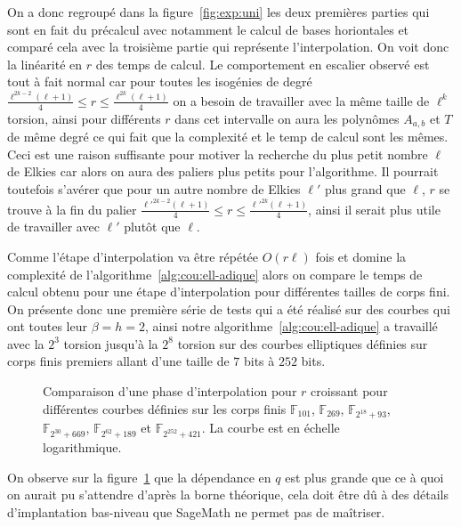 \documentclass[10pt,a4paper]{book}
\theoremstyle{plain}
\theoremstyle{definition}
\theoremstyle{definition}
\theoremstyle{definition}
\theoremstyle{definition}
\theoremstyle{remark}
\theoremstyle{remark}
\theoremstyle{definition}
\begin{document}
On a donc regroupé dans la figure~\ref{fig:exp:uni} les deux premières parties
qui sont en fait du précalcul avec notamment le calcul de bases horiontales et 
comparé cela avec la troisième partie qui représente l'interpolation. On voit 
donc la linéarité en $r$ des temps de calcul. 
Le comportement en escalier observé est tout à fait normal car pour toutes les 
isogénies de degré 
$\frac{\ell^{2k-2}(\ell+1)}{4} \leqslant r \leqslant \frac{\ell^{2k}(\ell+1)}{4}$ 
on a besoin de travailler avec la même taille de $\ell^{k}$ torsion, ainsi pour 
différents $r$ dans cet intervalle on aura les polynômes $A_{a,b}$ et $T$ de 
même degré ce qui fait que la complexité et le temp de calcul sont les mêmes. 
Ceci est une raison 
suffisante pour motiver la recherche du plus petit nombre $\ell$ de Elkies car
alors on aura des paliers plus petits pour l'algorithme. Il pourrait toutefois 
s'avérer que pour un autre nombre de Elkies $\ell'$ plus grand que $\ell$, $r$ 
se trouve à la fin du palier $\frac{\ell'^{2k-2}(\ell+1)}{4} \leqslant r 
\leqslant \frac{\ell'^{2k}(\ell+1)}{4}$, ainsi il serait plus utile de 
travailler avec $\ell'$ plutôt que $\ell$.

Comme l'étape d'interpolation va être répétée $O(r \ell)$ fois et domine la 
complexité de l'algorithme~\ref{alg:cou:ell-adique} alors on compare le temps 
de calcul obtenu pour une étape d'interpolation pour différentes tailles de 
corps fini.
On présente donc une première série de tests qui a été réalisé sur des 
courbes qui ont toutes leur $\beta=h=2$, ainsi notre 
algorithme~\ref{alg:cou:ell-adique} a travaillé avec la $2^3$ torsion jusqu'à la 
$2^8$ torsion sur des courbes elliptiques définies sur corps finis premiers 
allant d'une taille de $7$ bits à $252$ bits.



\begin{figure}
\label{fig:exp:dif}
%
\caption{Comparaison d'une phase d'interpolation pour $r$ croissant pour différentes courbes définies sur les corps finis $\mathbb{F}_{101}$, $\mathbb{F}_{269}$, $\mathbb{F}_{2^{18}+93 }$, $\mathbb{F}_{2^{30}+669}$, $\mathbb{F}_{2^{62}+189}$ et $\mathbb{F}_{2^{252}+421}$. La courbe est en échelle logarithmique.}
\end{figure}

On observe sur la figure~\ref{fig:exp:dif} que la dépendance en $q$ est plus 
grande que ce à quoi on aurait pu s'attendre d'après la borne théorique, cela 
doit être dû à des détails d'implantation bas-niveau que SageMath ne permet pas
de maîtriser.
\end{document}
